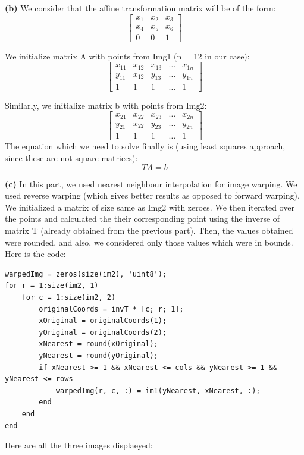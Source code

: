 \documentclass[12pt]{article}
\begin{document}
\textbf{(b)}
We consider that the affine transformation matrix will be of the form:
\[
    \begin{bmatrix}
        x_1 & x_2 & x_3 \\
        x_4 & x_5 & x_6 \\
        0 & 0 & 1
    \end{bmatrix}
\]

We initialize matrix A with points from Img1 (n = 12 in our case):
\[
    \begin{bmatrix}
        x_{11} & x_{12} & x_{13} & \dots & x_{1n} \\
        y_{11} & x_{12} & y_{13} & \dots & y_{1n} \\
        1 & 1 & 1 & \dots & 1
    \end{bmatrix}
\]

Similarly, we initialize matrix b with points from Img2:
\[
    \begin{bmatrix}
        x_{21} & x_{22} & x_{23} & \dots & x_{2n} \\
        y_{21} & x_{22} & y_{23} & \dots & y_{2n} \\
        1 & 1 & 1 & \dots & 1
    \end{bmatrix}
\]
The equation which we need to solve finally is (using least squares approach, since these are not square matrices):
\[TA = b\]


\textbf{(c)}
In this part, we used nearest neighbour interpolation for image warping. We used reverse warping (which gives better results as opposed to forward warping). We initialized a matrix of size same as Img2 with zeroes. We then iterated over the points and calculated the their corresponding point using the inverse of matrix T (already obtained from the previous part). Then, the values obtained were rounded, and also, we considered only those values which were in bounds. Here is the code:
\begin{verbatim}
warpedImg = zeros(size(im2), 'uint8');
for r = 1:size(im2, 1)
    for c = 1:size(im2, 2)
        originalCoords = invT * [c; r; 1];
        xOriginal = originalCoords(1);
        yOriginal = originalCoords(2);
        xNearest = round(xOriginal);
        yNearest = round(yOriginal);
        if xNearest >= 1 && xNearest <= cols && yNearest >= 1 && yNearest <= rows
            warpedImg(r, c, :) = im1(yNearest, xNearest, :);
        end
    end
end
\end{verbatim}

Here are all the three images displaeyed:
\end{document}

